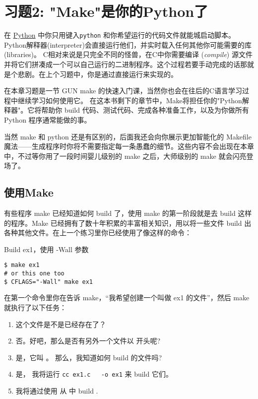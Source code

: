 \chapter{习题2: "Make"是你的Python了}

在 \href{http://learnpythonthehardway.org}{Python} 中你只用键入\verb|python| 和你希望运行的代码文件就能城启动脚本。Python解释器(interpreter)会直接运行他们，并实时载入任何其他你可能需要的库(libraries)。 C相对来说是只完全不同的怪兽，在C中你需要编译 (\emph{compile}) 源文件并将它们拼凑成一个可以自己运行的二进制程序。这个过程若要手动完成的话那就是个悲剧。在上个习题中，你是通过直接运行来实现的。

在本章习题是一节 GUN make 的快速入门课，当然你也会在往后的C语言学习过程中继续学习如何使用它。 在这本书剩下的章节中，Make将担任你的"Python解释器"。它将帮助你 build 代码、测试代码、完成各种准备工作，以及为你做所有 Python 程序通常能做的事。

当然 make 和 python 还是有区别的，后面我还会向你展示更加智能化的 Makefile 魔法——生成程序时你将不需要指定每一条愚蠢的细节。这些内容不会出现在本章中，不过等你用了一段时间婴儿级别的 make 之后，大师级别的 make 就会闪亮登场了。


\section{使用Make}

有些程序 make 已经知道如何 build 了，使用 make 的第一阶段就是去 build 这样的程序。Make 已经拥有了数十年积累的丰富相关知识，用以将一些文件 build 出各种其他文件。在上一个练习里你已经使用了像这样的命令：

\begin{Terminal}{Build ex1，使用 -Wall 参数}
\begin{lstlisting}
$ make ex1
# or this one too
$ CFLAGS="-Wall" make ex1
\end{lstlisting}
\end{Terminal}

在第一个命令里你在告诉 make，“我希望创建一个叫做 ex1 的文件”，然后 make 就执行了以下任务：

\begin{enumerate}
\item {} 这个文件是不是已经存在了？
\item 否。好吧，那么是否有另外一个文件以  开头呢?
\item 是，它叫 。 那么，我知道如何 build  的文件吗?
\item 是， 我将运行 \verb|cc ex1.c   -o ex1| 来 build 它们。
\item 我将通过使用  从  中 build .
\end{enumerate}

